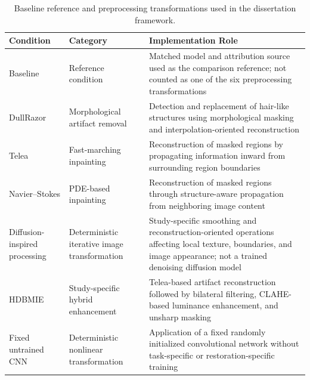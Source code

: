 \begin{table}[H]
\centering
\caption{Baseline reference and preprocessing transformations used in the dissertation framework.}
\label{tab:preprocessing_methods_appendix}

\small
\renewcommand{\arraystretch}{1.18}
\setlength{\tabcolsep}{4pt}

\begin{tabular}{p{3.2cm}p{3.8cm}p{5.0cm}}
\toprule
\textbf{Condition} & \textbf{Category} & \textbf{Implementation Role} \\
\midrule

Baseline
& Reference condition
& Matched model and attribution source used as the comparison reference; not counted as one of the six preprocessing transformations \\

DullRazor
& Morphological artifact removal
& Detection and replacement of hair-like structures using morphological masking and interpolation-oriented reconstruction \\

Telea
& Fast-marching inpainting
& Reconstruction of masked regions by propagating information inward from surrounding region boundaries \\

Navier--Stokes
& PDE-based inpainting
& Reconstruction of masked regions through structure-aware propagation from neighboring image content \\

Diffusion-inspired processing
& Deterministic iterative image transformation
& Study-specific smoothing and reconstruction-oriented operations affecting local texture, boundaries, and image appearance; not a trained denoising diffusion model \\

HDBMIE
& Study-specific hybrid enhancement
& Telea-based artifact reconstruction followed by bilateral filtering, CLAHE-based luminance enhancement, and unsharp masking \\

Fixed untrained CNN
& Deterministic nonlinear transformation
& Application of a fixed randomly initialized convolutional network without task-specific or restoration-specific training \\

\bottomrule
\end{tabular}
\end{table}
